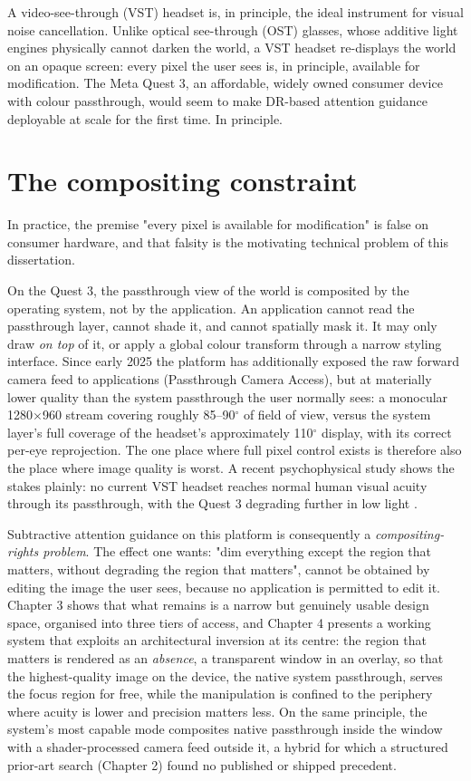 A video-see-through (VST) headset is, in principle, the ideal instrument for visual noise
cancellation. Unlike optical see-through (OST) glasses, whose additive light engines physically
cannot darken the world, a VST headset re-displays the world on an opaque screen: every pixel the
user sees is, in principle, available for modification. The Meta Quest 3, an affordable, widely
owned consumer device with colour passthrough, would seem to make DR-based attention guidance
deployable at scale for the first time. In principle.

\section{The compositing constraint}

In practice, the premise "every pixel is available for modification" is false on consumer hardware,
and that falsity is the motivating technical problem of this dissertation.

On the Quest 3, the passthrough view of the world is composited by the operating system, not by the
application. An application cannot read the passthrough layer, cannot shade it, and cannot spatially
mask it. It may only draw \textit{on top} of it, or apply a global colour transform through a narrow styling
interface. Since early 2025 the platform has additionally exposed the raw forward camera feed to
applications (Passthrough Camera Access), but at materially lower quality than the system passthrough
the user normally sees: a monocular 1280$\times$960 stream covering roughly 85–90$^{\circ}$ of field of view, versus
the system layer's full coverage of the headset's approximately 110$^{\circ}$ display, with its correct
per-eye reprojection. The one place where full pixel control exists is therefore also the place where
image quality is worst. A recent psychophysical study shows the stakes plainly: no current VST
headset reaches normal human visual acuity through its passthrough, with the Quest 3 degrading
further in low light \citep{wang2026}.

Subtractive attention guidance on this platform is consequently a \textit{compositing-rights problem}. The
effect one wants: "dim everything except the region that matters, without degrading the region that
matters", cannot be obtained by editing the image the user sees, because no application is permitted
to edit it. Chapter 3 shows that what remains is a narrow but genuinely usable design space, organised
into three tiers of access, and Chapter 4 presents a working system that exploits an architectural
inversion at its centre: the region that matters is rendered as an \textit{absence},  a transparent window
in an overlay, so that the highest-quality image on the device, the native system passthrough,
serves the focus region for free, while the manipulation is confined to the periphery where acuity is
lower and precision matters less. On the same principle, the system's most capable mode composites
native passthrough inside the window with a shader-processed camera feed outside it, a hybrid for
which a structured prior-art search (Chapter 2) found no published or shipped precedent.

